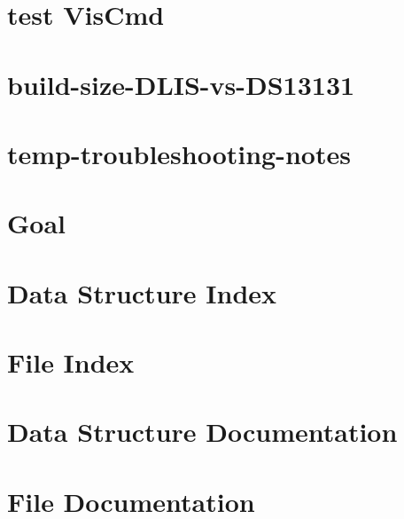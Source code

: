 \let\mypdfximage\pdfximage\def\pdfximage{\immediate\mypdfximage}\documentclass[twoside]{book}
\newcommand{\+}{\discretionary{\mbox{\scriptsize$\hookleftarrow$}}{}{}}
\newcommand{\clearemptydoublepage}{%
  \newpage{\pagestyle{empty}\cleardoublepage}%
}
\begin{document}
\chapter{test Vis\+Cmd}
\label{md_vis_spi_out_build_test_runner_LIS}

\chapter{build-\/size-\/\+DLIS-\/vs-\/\+DS13131}
\label{md_vis_spi_out_build_size_DLIS_vs_DS13131}

\chapter{temp-\/troubleshooting-\/notes}
\label{md_vis_spi_out_temp_troubleshooting_notes}

\chapter{Goal}
\label{md_what_the_python}

\chapter{Data Structure Index}

\chapter{File Index}

\chapter{Data Structure Documentation}






\chapter{File Documentation}






































\backmatter
\newpage
{}
\clearemptydoublepage
{}
\printindex
\end{document}
